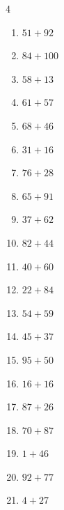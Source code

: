 \begin{multicols}{4}
\begin{enumerate}
  \item $51+92$
        \phantom{$=143$}

  \item $84+100$
        \phantom{$=184$}

  \item $58+13$
        \phantom{$=71$}

  \item $61+57$
        \phantom{$=118$}

  \item $68+46$
        \phantom{$=114$}

  \item $31+16$
        \phantom{$=47$}

  \item $76+28$
        \phantom{$=104$}

  \item $65+91$
        \phantom{$=156$}

  \item $37+62$
        \phantom{$=99$}

  \item $82+44$
        \phantom{$=126$}

  \item $40+60$
        \phantom{$=100$}

  \item $22+84$
        \phantom{$=106$}

\columnbreak %

  \item $54+59$
        \phantom{$=113$}

  \item $45+37$
        \phantom{$=82$}

  \item $95+50$
        \phantom{$=145$}

  \item $16+16$
        \phantom{$=32$}

  \item $87+26$
        \phantom{$=113$}

  \item $70+87$
        \phantom{$=157$}

  \item $1+46$
        \phantom{$=47$}

  \item $92+77$
        \phantom{$=169$}

  \item $4+27$
        \phantom{$=31$}


\end{enumerate}
\end{multicols}
